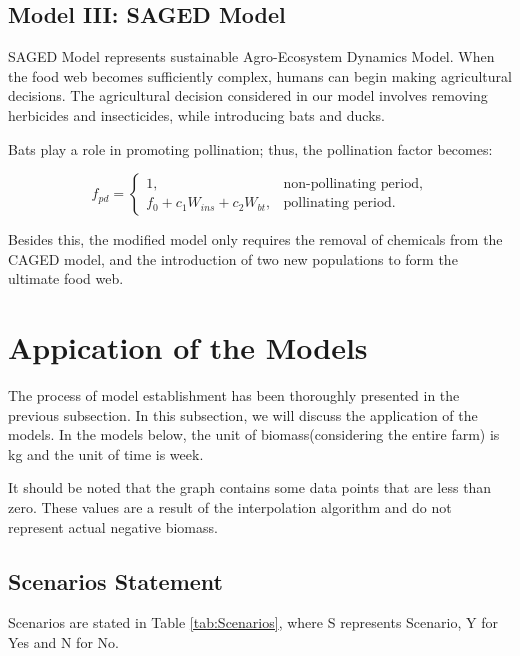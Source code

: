 \documentclass{HZNUMCM}
\begin{document}
    \subsection{Model III: SAGED Model}
      SAGED Model represents sustainable Agro-Ecosystem Dynamics Model.
      When the food web becomes sufficiently complex, humans can begin making agricultural decisions. The agricultural decision considered in our model involves removing herbicides and insecticides, while introducing bats and ducks.

      Bats play a role in promoting pollination; thus, the pollination factor becomes:
      
      \[
      f_{pd} = \begin{cases}
      1, & \text{non-pollinating period}, \\
      f_0 + c_1 W_{ins} + c_2 W_{bt}, & \text{pollinating period}.
      \end{cases}
      \]
      
      Besides this, the modified model only requires the removal of chemicals from the CAGED model, and the introduction of two new populations to form the ultimate food web.

  \section{Appication of the Models}
    The process of model establishment has been thoroughly presented in the previous subsection. 
    In this subsection, we will discuss the application of the models.
    In the models below, the unit of biomass(considering the entire farm) is kg and the unit of time is week.
        
    It should be noted that the graph contains some data points that are less than zero. 
    These values are a result of the interpolation algorithm and do not represent actual negative biomass. 
        
      
      \subsection{Scenarios Statement}
        Scenarios are stated in Table \ref{tab:Scenarios}, where S represents Scenario, Y for Yes and N for No.
\end{document}
